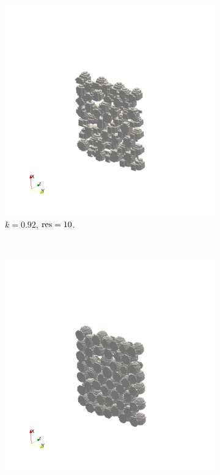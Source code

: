 \begin{figure}[ht]
        \centering
        \begin{subfigure}[b]{0.3\textwidth}
                \includegraphics[width=\textwidth, trim={200pt, 150pt, 200pt, 200pt},clip]{figures/lbm/k092res10}
                \caption{$k = 0.92$, $\text{res} = 10$.}
                \label{fig:k092res10}
        \end{subfigure}%
        ~
        \begin{subfigure}[b]{0.3\textwidth}
                \includegraphics[width=\textwidth, trim={200pt, 150pt, 200pt, 200pt},clip]{figures/lbm/k0947res20}

\end{subfigure}
\end{figure}
